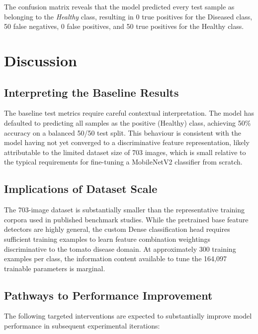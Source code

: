 \documentclass[12pt,a4paper]{report}
\begin{document}
\noindent The confusion matrix reveals that the model predicted every test sample as belonging to the \textit{Healthy} class, resulting in 0 true positives for the Diseased class, 50 false negatives, 0 false positives, and 50 true positives for the Healthy class.

\section{Discussion}

\subsection{Interpreting the Baseline Results}

The baseline test metrics require careful contextual interpretation. The model has defaulted to predicting all samples as the positive (Healthy) class, achieving 50\% accuracy on a balanced 50/50 test split. This behaviour is consistent with the model having not yet converged to a discriminative feature representation, likely attributable to the limited dataset size of 703 images, which is small relative to the typical requirements for fine-tuning a MobileNetV2 classifier from scratch.

\subsection{Implications of Dataset Scale}

The 703-image dataset is substantially smaller than the representative training corpora used in published benchmark studies. While the pretrained base feature detectors are highly general, the custom Dense classification head requires sufficient training examples to learn feature combination weightings discriminative to the tomato disease domain. At approximately 300 training examples per class, the information content available to tune the 164,097 trainable parameters is marginal.

\subsection{Pathways to Performance Improvement}

The following targeted interventions are expected to substantially improve model performance in subsequent experimental iterations:
\end{document}
